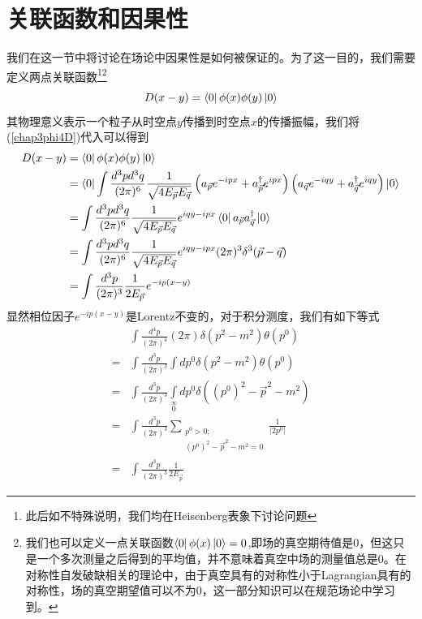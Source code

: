 \section{关联函数和因果性}
我们在这一节中将讨论在场论中因果性是如何被保证的。为了这一目的，我们需要定义两点关联函数\footnote{此后如不特殊说明，我们均在Heisenberg表象下讨论问题}\footnote{我们也可以定义一点关联函数$\bra{0}\phi(x)\ket{0}=0$,即场的真空期待值是0，但这只是一个多次测量之后得到的平均值，并不意味着真空中场的测量值总是0。在对称性自发破缺相关的理论中，由于真空具有的对称性小于Lagrangian具有的对称性，场的真空期望值可以不为0，这一部分知识可以在规范场论中学习到。}
\begin{equation}
    D(x-y)=\bra{0}\phi(x)\phi(y)\ket{0}
\end{equation}
其物理意义表示一个粒子从时空点$y$传播到时空点$x$的传播振幅，我们将(\ref{chap3phi4D})代入可以得到
\begin{equation}
    \begin{aligned}
        D(x-y)&=\bra{0}\phi(x)\phi(y)\ket{0}\\
        &=\bra{0}\int \frac{d^{3}pd^{3}q}{(2\pi)^{6}}\frac{1}{\sqrt{4E_{\vec{p}}E_{\vec{q}}}}\left(a_{\vec{p}}e^{-ipx}+a^{\dagger}_{\vec{p}}e^{ipx}\right)\left(a_{\vec{q}}e^{-iqy}+a^{\dagger}_{\vec{q}}e^{iqy}\right)\ket{0}\\
        &=\int \frac{d^{3}pd^{3}q}{(2\pi)^{6}}\frac{1}{\sqrt{4E_{\vec{p}}E_{\vec{q}}}}e^{iqy-ipx}\bra{0}a_{\vec{p}}a^{\dagger}_{\vec{q}}\ket{0}\\
         &=\int \frac{d^{3}pd^{3}q}{(2\pi)^{6}}\frac{1}{\sqrt{4E_{\vec{p}}E_{\vec{q}}}}e^{iqy-ipx}(2\pi)^{3}\delta^{3}(\vec{p}-\vec{q})\\
         &=\int \frac{d^{3}p}{(2\pi)^{3}}\frac{1}{2E_{\vec{p}}}e^{-ip(x-y)}\\
    \end{aligned}
\end{equation}
显然相位因子$e^{-ip(x-y)}$是Lorentz不变的，对于积分测度，我们有如下等式
\begin{equation}
    \begin{aligned}
       &\int \frac{d^{4}p}{(2\pi)^{4}}(2\pi)\delta(p^{2}-m^{2})\theta(p^{0})\\
       =&\int \frac{d^{3}p}{(2\pi)^{3}}\int dp^{0}\delta(p^{2}-m^{2})\theta(p^{0})\\
       =&\int \frac{d^{3}p}{(2\pi)^{3}}\int\limits_{0}\limits^{\infty} dp^{0}\delta\left((p^{0})^{2}-\vec{p}^{2}-m^{2}\right)\\
       =&\int \frac{d^{3}p}{(2\pi)^{3}}\sum_{\substack{p^{0}>0;\\(p^{0})^{2}-\vec{p}^{2}-m^{2}=0}}\frac{1}{|2p^{0}|}\\
       =&\int \frac{d^{3}p}{(2\pi)^{3}}\frac{1}{2E_{\vec{p}}}
    \end{aligned}
\end{equation}
